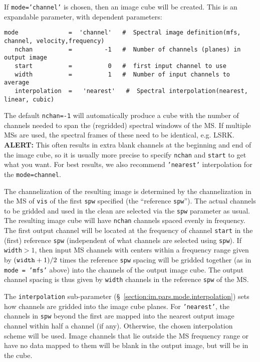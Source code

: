 If {\tt mode='channel'} is chosen, then an image cube will be
created. This is an expandable parameter, with dependent parameters:
\small
\begin{verbatim}
mode              =  'channel'   #  Spectral image definition(mfs, channel, velocity,frequency)
   nchan          =         -1   #  Number of channels (planes) in output image
   start          =          0   #  first input channel to use
   width          =          1   #  Number of input channels to average
   interpolation  =   'nearest'   #  Spectral interpolation(nearest, linear, cubic)
\end{verbatim}
\normalsize The default {\tt nchan=-1} will automatically produce a
cube with the number of channels needed to span the (regridded)
spectral windows of the MS. If multiple MSs are used, the spectral
frames of these need to be identical, e.g. LSRK.  {\bf ALERT:} This
often results in extra blank channels at the beginning and end of the
image cube, so it is usually more precise to specify {\tt nchan} and
{\tt start} to get what you want. For best results, we also recommend
{\tt 'nearest'} interpolation for the {\tt mode=channel}.

The channelization of the resulting image is determined by the
channelization in the MS of {\tt vis} of the first {\tt spw} specified
(the ``reference {\tt spw}''). The actual channels to be gridded and
used in the clean are selected via the {\tt spw} parameter as usual.
The resulting image cube will have {\tt nchan} channels spaced evenly
in frequency.  The first output channel will be located at the
frequency of channel {\tt start} in the (first) reference {\tt spw}
(independent of what channels are selected using {\tt spw}).  If {\tt
  width}$ > 1$, then input MS channels with centers within a frequency
range given by $({\tt width}+1)/2$ times the reference {\tt spw}
spacing will be gridded together (as in {\tt mode = 'mfs'} above) into
the channels of the output image cube.  The output channel spacing is
thus given by {\tt width} channels in the reference {\tt spw} of the
MS.
  
The {\tt interpolation} sub-parameter
(\S~\ref{section:im.pars.mode.interpolation}) sets how channels are
gridded into the image cube planes.  For {\tt 'nearest'}, the
channels in {\tt spw} beyond the first are mapped
into the nearest output image channel within half a channel (if
any).  Otherwise, the chosen interpolation scheme will be used.
Image channels that lie outside the MS frequency range or
have no data mapped to them will be blank in the output image,
but will be in the cube.  

